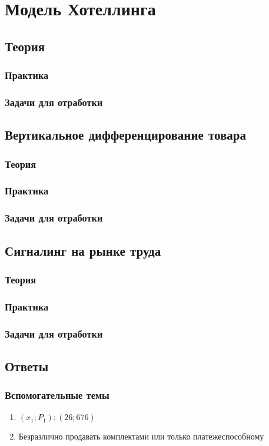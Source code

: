 \chapter{Модель Хотеллинга}
\section{Теория}


\subsection{Практика}
\subsection{Задачи для отработки}

\section{Вертикальное дифференцирование товара}
\subsection{Теория}
\subsection{Практика}
\subsection{Задачи для отработки}

\section{Сигналинг на рынке труда}
\subsection{Теория}
\subsection{Практика}
\subsection{Задачи для отработки}

\section{Ответы}
\subsection{Вспомогательные темы}
\begin{enumerate}
    \item $(x_1;P_1): (26;676)$
    \item Безразлично продавать комплектами или только платежеспособному
\end{enumerate}
